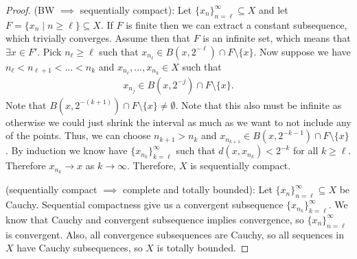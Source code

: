 \documentclass{report}
\begin{document}
\newpage
{}
\begin{proof}
    (BW $\implies$ sequentially compact): Let $\{x_n\}_{n = \ell}^\infty \subseteq X$ and let $F = \{x_n \mid n \geq \ell\} \subseteq X$. If $F$ is finite then we can extract a constant subsequence, which trivially converges. Assume then that $F$ is an infinite set, which means that $\exists x \in F'$. Pick $n_\ell \geq \ell$ such that $x_{n_\ell} \in B(x, 2^{-\ell}) \cap F \setminus \{x\}$. Now suppose we have $n_\ell < n_{\ell+1} < \dots < n_k$ and $x_{n_\ell}, \ldots, x_{n_k} \in X$ such that
    \begin{align*}
        x_{n_j} \in B(x, 2^{-j}) \cap F \setminus \{x\}.
    \end{align*}
    Note that $B(x, 2^{-(k+1)}) \cap F \setminus \{x\} \neq \emptyset$. Note that this also must be infinite as otherwise we could just shrink the interval as much as we want to not include any of the points. Thus, we can choose $n_{k+1} > n_k$ and $x_{n_{k+1}} \in B(x, 2^{-k - 1}) \cap F \setminus \{x\}$. By induction we know have $\{x_{n_k}\}_{k = \ell}^\infty$ such that $d(x, x_{n_k}) < 2^{-k}$ for all $k \geq \ell$. Therefore $x_{n_k} \to x$ as $k \to \infty$. Therefore, $X$ is sequentially compact.

    (sequentially compact $\implies$ complete and totally bounded): Let $\{x_n\}_{n=\ell}^\infty \subseteq X$ be Cauchy. Sequential compactness give us a convergent subsequence $\{x_{n_k}\}_{k=\ell}^\infty$. We know that Cauchy and convergent subsequence implies convergence, so $\{x_n\}_{n=\ell}^\infty$ is convergent. Also, all convergence subsequences are Cauchy, so all sequences in $X$ have Cauchy subsequences, so $X$ is totally bounded. 


\end{proof}
\end{document}
